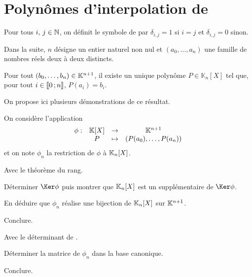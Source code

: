 \section{Polynômes d'interpolation de }

Pour tous $i,\, j \in \mathbb{N}$, on définit le symbole de  par $\delta_{i,j} = 1$ si $i = j$ et $\delta_{i,j} = 0$ sinon.

Dans la suite, $n$ désigne un entier naturel non nul et $(a_0, \ldots, a_n)$ une famille de nombres réels deux à deux distincts.

\begin{defi}
Pour tout $(b_0,\ldots,b_n) \in \mathbb{K}^{n+1}$, il existe un unique polynôme $P \in \mathbb{K}_n[X]$ tel que, pour tout $i \in \llbracket 0\,; n \rrbracket$, $P(a_i) = b_i$.
\end{defi}


On propose ici plusieurs démonstrations de ce résultat.

\begin{exercice}
On considère l'application
\[
\begin{array}{lccc}
\phi : & \mathbb{K}[X] &\to& \mathbb{K}^{n+1}\\
&P&\mapsto&(P(a_0),\ldots,P(a_n))
\end{array}
\]
et on note $\phi_n$ la restriction de $\phi$ à $\mathbb{K}_n[X]$.
\begin{questions}
\item Avec le théorème du rang.
\begin{questions}
\item Déterminer $\Ker \phi$ puis montrer que $\mathbb{K}_n[X]$ est un supplémentaire de $\Ker \phi$.

\item En déduire que $\phi_n$ réalise une bijection de $\mathbb{K}_n[X]$ sur $\mathbb{K}^{n+1}$.

\item Conclure.
\end{questions}

\item Avec le déterminant de .
\begin{questions}
\item Déterminer la matrice de $\phi_n$ dans la base canonique.

\item Conclure.
\end{questions}
\end{questions}
\end{exercice}


